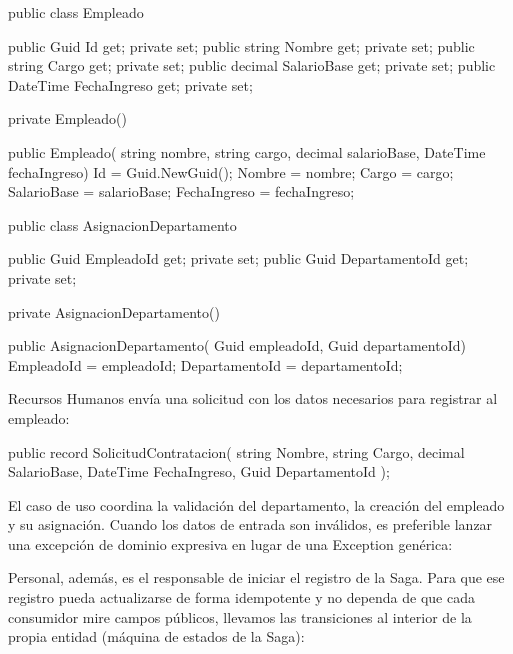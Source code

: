\documentclass[12pt, a4paper]{article}
\begin{document}
    \begin{csharpbox}
public class Empleado
{
    public Guid Id { get; private set; }
    public string Nombre { get; private set; }
    public string Cargo { get; private set; }
    public decimal SalarioBase { get; private set; }
    public DateTime FechaIngreso { get; private set; }

    private Empleado() { }

    public Empleado(
        string nombre,
        string cargo,
        decimal salarioBase,
        DateTime fechaIngreso)
    {
        Id = Guid.NewGuid();
        Nombre = nombre;
        Cargo = cargo;
        SalarioBase = salarioBase;
        FechaIngreso = fechaIngreso;
    }
}

public class AsignacionDepartamento
{
    public Guid EmpleadoId { get; private set; }
    public Guid DepartamentoId { get; private set; }

    private AsignacionDepartamento() { }

    public AsignacionDepartamento(
        Guid empleadoId,
        Guid departamentoId)
    {
        EmpleadoId = empleadoId;
        DepartamentoId = departamentoId;
    }
}
    \end{csharpbox}

    Recursos Humanos envía una solicitud con los datos necesarios para registrar al empleado:

    \begin{csharpbox}
public record SolicitudContratacion(
    string Nombre,
    string Cargo,
    decimal SalarioBase,
    DateTime FechaIngreso,
    Guid DepartamentoId
);
    \end{csharpbox}

    El caso de uso coordina la validación del departamento, la creación del empleado y su asignación. Cuando los datos de entrada son inválidos, es preferible lanzar una excepción de dominio expresiva en lugar de una Exception genérica:


    Personal, además, es el responsable de iniciar el registro de la Saga. Para que ese registro pueda actualizarse de forma idempotente y no dependa de que cada consumidor mire campos públicos, llevamos las transiciones al interior de la propia entidad (máquina de estados de la Saga):
\end{document}
